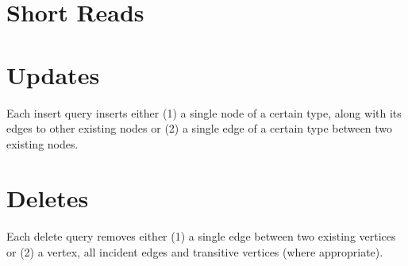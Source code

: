 
\section{Short Reads}
\label{sec:short-reads}










\section{Updates}
\label{sec:updates}

Each insert query inserts either (1) a single node of a certain type, along with its edges to other existing nodes or (2) a single edge of a certain type between two existing nodes.










\section{Deletes}
\label{sec:deletes}

Each delete query removes either (1) a single edge between two existing vertices or (2) a vertex, all incident edges and transitive vertices (where appropriate).










\renewcommand{\currentQueryCard}{0}
